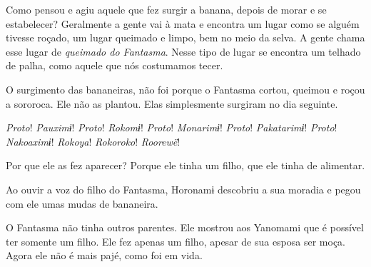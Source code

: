   

Como pensou e agiu aquele que fez surgir a banana, depois de morar e se
estabelecer? Geralmente a gente vai à mata e encontra um lugar como se
alguém tivesse roçado, um lugar queimado e limpo, bem no meio da selva.
A gente chama esse lugar de \textit{queimado do Fantasma}. Nesse tipo de
lugar se encontra um telhado de palha, como aquele que nós costumamos
tecer. 


O surgimento das bananeiras, não foi porque o Fantasma cortou, queimou e
roçou a sororoca. Ele não as plantou. Elas simplesmente surgiram no dia
seguinte. 

\textit{Proto}! \textit{Pauximɨ}! \textit{Proto}! \textit{Rokomɨ}! \textit{Proto}! \textit{Monarimɨ}!
\textit{Proto}! \textit{Pakatarimɨ}!
\textit{Proto}! \textit{Nakoaximɨ}! \textit{Rokoya}! \textit{Rokoroko}! \textit{Roorewë}! 


Por que ele as fez aparecer? Porque ele tinha um filho, que ele tinha de
alimentar. 

Ao ouvir a voz do filho do Fantasma, Horonamɨ descobriu a sua moradia e
pegou com ele umas mudas de bananeira. 

O Fantasma não tinha outros parentes. Ele mostrou aos Yanomami que é
possível ter somente um filho. Ele fez apenas um filho, apesar de sua
esposa ser moça. Agora ele não é mais pajé, como foi em vida. 

